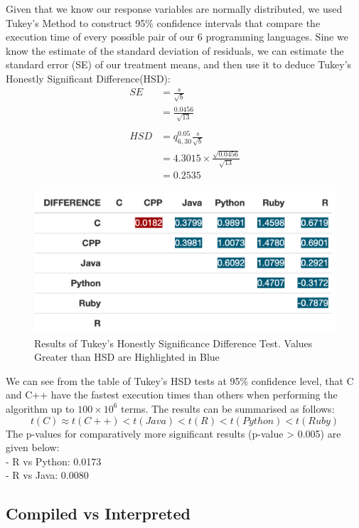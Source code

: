 \documentclass[12pt,halfline,a4paper,]{ouparticle}
\begin{document}
Given that we know our response variables are normally distributed, we
used Tukey's Method to construct 95\% confidence intervals that compare
the execution time of every possible pair of our 6 programming
languages. Sine we know the estimate of the standard deviation of
residuals, we can estimate the standard error (SE) of our treatment
means, and then use it to deduce Tukey's Honestly Significant
Difference(HSD): \[
\begin{aligned}
SE &= \frac{s}{\sqrt{b}}\\
&= \frac{0.0456}{\sqrt{13}}\\\\
HSD &= q_{6,30}^{0.05} \frac{s}{\sqrt{b}}\\
&= 4.3015 \times \frac{\sqrt{0.0456}}{\sqrt{13}}\\
&= 0.2535
\end{aligned}
\]

\begin{figure}[H]
\includegraphics[width=1\linewidth]{skeleton_files/table_tukey} \caption{Results of Tukey's Honestly Significance Difference Test. Values Greater than HSD are Highlighted in Blue}\label{fig:tableTukey}
\end{figure}

We can see from the table of Tukey's HSD tests at 95\% confidence level,
that C and C++ have the fastest execution times than others when
performing the algorithm up to \(100 \times 10^6\) terms. The results
can be summarised as follows: \[
t(C) \approx t(C++) < t(Java) < t(R) < t(Python) < t(Ruby)
\] The p-values for comparatively more significant results (p-value
\textgreater{} 0.005) are given below:\\
- R vs Python: 0.0173\\
- R vs Java: 0.0080

\subsection{Compiled vs Interpreted}\label{compiled-vs-interpreted}
\end{document}
